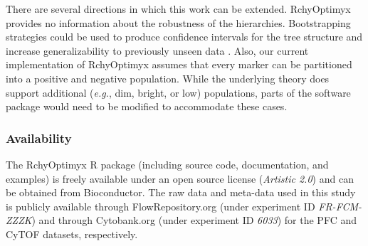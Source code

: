 There are several directions in which this work can be extended.
RchyOptimyx provides no information about the robustness of the hierarchies.
Bootstrapping strategies could be used to produce confidence intervals for the tree structure and increase generalizability to previously unseen data \cite{suzuki2006pvclust}.
Also, our current implementation of RchyOptimyx assumes that every marker can be partitioned into a positive and negative population.
While the underlying theory does support additional (\emph{e.g.}, dim, bright, or low) populations, parts of the software package would need to be modified to accommodate these cases.


\subsubsection{Availability}
The RchyOptimyx R package (including source code, documentation, and examples) is freely available under an open source license (\emph{Artistic 2.0}) and can be obtained from Bioconductor.
The raw data and meta-data used in this study is publicly available through FlowRepository.org (under experiment ID \emph{FR-FCM-ZZZK}) and through Cytobank.org (under experiment ID \emph{6033}) for the PFC and CyTOF datasets, respectively.


